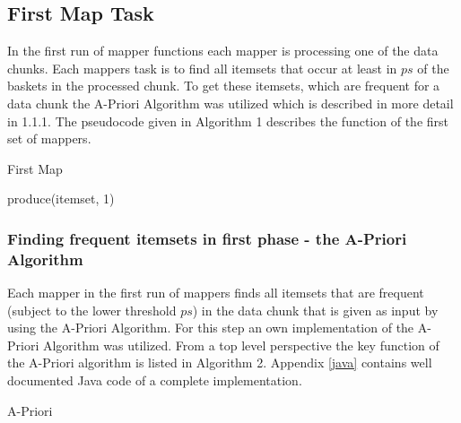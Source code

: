 \subsection{First Map Task}\label{first map task}
In the first run of mapper functions each mapper is processing one of the data chunks. Each mappers task is to find all itemsets that occur at least in $ps$ of the baskets in the processed chunk. To get these itemsets, which are frequent for a data chunk the A-Priori Algorithm was utilized which is described in more detail in 1.1.1.
The pseudocode given in Algorithm 1 describes the function of the first set of mappers.
\begin{algorithm}
  \caption{First Map}\label{First Map}
  \begin{algorithmic}[1]
     
            \State produce(itemset, 1)
       \EndFor

    \EndFunction
\end{algorithmic}
\end{algorithm}
\subsubsection{Finding frequent itemsets in first phase - the A-Priori Algorithm}\label{A-Priori}
Each mapper in the first run of mappers finds all itemsets that are frequent (subject to the lower threshold $ps$) in the data chunk that is given as input by using the A-Priori Algorithm. For this step an own implementation of the A-Priori Algorithm was utilized. From a top level perspective the key function of the A-Priori algorithm is listed in Algorithm 2. Appendix \ref{java} contains well documented Java code of a complete implementation.
\begin{algorithm}
  \caption{A-Priori}\label{Apriori}
  \begin{algorithmic}[1]
      \EndIf
      \EndIf
      \EndWhile
      \State {}
    \EndFunction
\end{algorithmic}
\end{algorithm}
